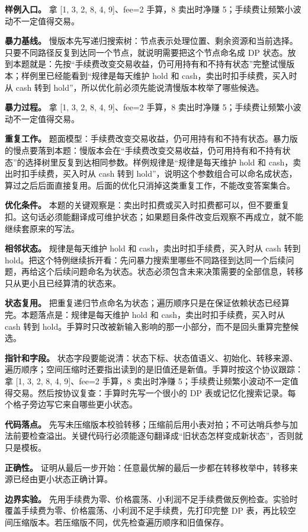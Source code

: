 \textbf{样例入口。} 拿 [1, 3, 2, 8, 4, 9]、fee=2 手算，8 卖出时净赚 5；手续费让频繁小波动不一定值得交易。

\textbf{暴力基线。} 慢版本先写递归搜索树：节点表示处理位置、剩余资源和当前选择。只要不同路径反复到达同一个节点，就说明需要把这个节点命名成 DP 状态。放到本题就是：先按“手续费改变交易收益，仍可用持有和不持有状态”完整试慢版本；样例里已经能看到“规律是每天维护 hold 和 cash，卖出时扣手续费，买入时从 cash 转到 hold”，所以优化前必须先能说清慢版本枚举了哪些候选。

\textbf{暴力过程。} 拿 [1, 3, 2, 8, 4, 9]、fee=2 手算，8 卖出时净赚 5；手续费让频繁小波动不一定值得交易。

\textbf{重复工作。} 题面模型：手续费改变交易收益，仍可用持有和不持有状态。暴力版的慢点要落到本题：慢版本会在“手续费改变交易收益，仍可用持有和不持有状态”的选择树里反复到达相同参数。样例规律是“规律是每天维护 hold 和 cash，卖出时扣手续费，买入时从 cash 转到 hold”，说明这个参数组合可以命名成状态，算过之后后面直接复用。后面的优化只消掉这类重复工作，不能改变答案集合。

\textbf{优化条件。} 本题的关键观察是：卖出时扣费或买入时扣费都可以，但不要重复扣。这句话必须能翻译成可维护状态；如果题目条件改变后观察不再成立，就不能继续套原来的写法。

\textbf{相邻状态。} 规律是每天维护 hold 和 cash，卖出时扣手续费，买入时从 cash 转到 hold。把这个特例继续拆开看：先问暴力搜索里哪些不同路径到达同一个后续问题，再给这个后续问题命名为状态。状态必须包含未来决策需要的全部信息，转移只从更小且已经算清的状态来。

\textbf{状态复用。} 把重复递归节点命名为状态；遍历顺序只是在保证依赖状态已经算完。本题落点是：规律是每天维护 hold 和 cash，卖出时扣手续费，买入时从 cash 转到 hold。手算时只改被新输入影响的那一小部分，而不是回头重算完整候选。

\textbf{指针和字段。} 状态字段要能说清：状态下标、状态值语义、初始化、转移来源、遍历顺序；空间压缩时还要指出读到的是旧值还是新值。手算时按这个协议跟踪：拿 [1, 3, 2, 8, 4, 9]、fee=2 手算，8 卖出时净赚 5；手续费让频繁小波动不一定值得交易。然后按协议复查：手算时先写一个很小的 DP 表或记忆化搜索记录。每个格子旁边写它来自哪些更小状态。

\textbf{代码落点。} 先写未压缩版本校验转移；压缩前后用小表对拍；不可达哨兵参与加法前要检查溢出。关键代码行必须能逐句翻译成“旧状态怎样变成新状态”，否则就只是模板。

\textbf{正确性。} 证明从最后一步开始：任意最优解的最后一步都在转移枚举中，转移来源已经由更小状态正确计算。

\textbf{边界实验。} 先用手续费为零、价格震荡、小利润不足手续费做反例检查。实验时覆盖手续费为零、价格震荡、小利润不足手续费，先打印完整 DP 表，再比较空间压缩版本。若压缩版不同，优先检查遍历顺序和旧值保存。

